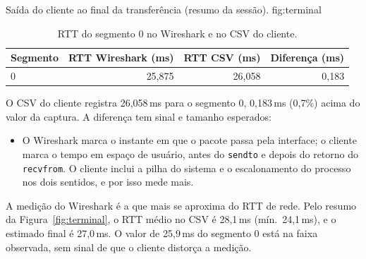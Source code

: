   {Saída do cliente ao final da transferência (resumo da sessão).}
  {fig:terminal}

\begin{table}[H]
  \centering
  \caption{RTT do segmento 0 no Wireshark e no CSV do cliente.}
  \label{tab:rtt-wireshark}
  \begin{tabular}{lrrr}
    \toprule
    Segmento & RTT Wireshark (ms) & RTT CSV (ms) & Diferença (ms)\\
    \midrule
    0 & 25,875 & 26,058 & 0,183\\
    \bottomrule
  \end{tabular}
\end{table}

O CSV do cliente registra 26,058\,ms para o segmento 0, 0,183\,ms (0,7\%)
acima do valor da captura. A diferença tem sinal e tamanho esperados:
\begin{itemize}
  \item O Wireshark marca o instante em que o pacote passa pela interface; o
    cliente marca o tempo em espaço de usuário, antes do \texttt{sendto} e
    depois do retorno do \texttt{recvfrom}. O cliente inclui a pilha do
    sistema e o escalonamento do processo nos dois sentidos, e por isso mede
    mais.
\end{itemize}
A medição do Wireshark é a que mais se aproxima do RTT de rede. Pelo resumo
da Figura~\ref{fig:terminal}, o RTT médio no CSV é 28,1\,ms (mín.\ 24,1\,ms),
e o estimado final é 27,0\,ms. O valor de 25,9\,ms do segmento 0 está na
faixa observada, sem sinal de que o cliente distorça a medição. 
